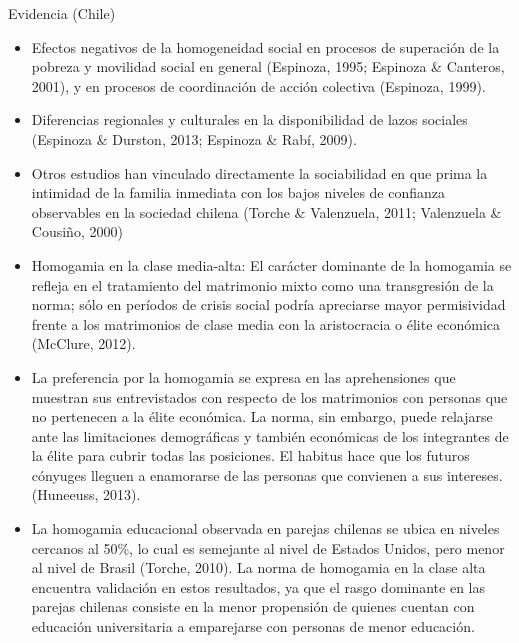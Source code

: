 \documentclass[
  8pt,
  ignorenonframetext,
]{beamer}
\begin{document}
\begin{frame}{Evidencia (Chile)}
\protect\hypertarget{evidencia-chile}{}
\begin{itemize}
\item
  Efectos negativos de la homogeneidad social en procesos de superación
  de la pobreza y movilidad social en general (Espinoza, 1995; Espinoza
  \& Canteros, 2001), y en procesos de coordinación de acción colectiva
  (Espinoza, 1999).
\item
  Diferencias regionales y culturales en la disponibilidad de lazos
  sociales (Espinoza \& Durston, 2013; Espinoza \& Rabí, 2009).
\item
  Otros estudios han vinculado directamente la sociabilidad en que prima
  la intimidad de la familia inmediata con los bajos niveles de
  confianza observables en la sociedad chilena (Torche \& Valenzuela,
  2011; Valenzuela \& Cousiño, 2000)
\item
  Homogamia en la clase media-alta: El carácter dominante de la
  homogamia se refleja en el tratamiento del matrimonio mixto como una
  transgresión de la norma; sólo en períodos de crisis social podría
  apreciarse mayor permisividad frente a los matrimonios de clase media
  con la aristocracia o élite económica (McClure, 2012).
\item
  La preferencia por la homogamia se expresa en las aprehensiones que
  muestran sus entrevistados con respecto de los matrimonios con
  personas que no pertenecen a la élite económica. La norma, sin
  embargo, puede relajarse ante las limitaciones demográficas y también
  económicas de los integrantes de la élite para cubrir todas las
  posiciones. El habitus hace que los futuros cónyuges lleguen a
  enamorarse de las personas que convienen a sus intereses.(Huneeuss,
  2013).
\item
  La homogamia educacional observada en parejas chilenas se ubica en
  niveles cercanos al 50\%, lo cual es semejante al nivel de Estados
  Unidos, pero menor al nivel de Brasil (Torche, 2010). La norma de
  homogamia en la clase alta encuentra validación en estos resultados,
  ya que el rasgo dominante en las parejas chilenas consiste en la menor
  propensión de quienes cuentan con educación universitaria a
  emparejarse con personas de menor educación.
\end{itemize}
\end{frame}
\end{document}
